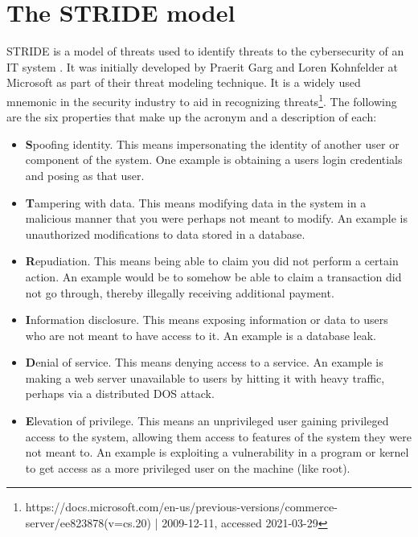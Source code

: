 \section{The STRIDE model} \label{ch:method:stride}
STRIDE is a model of threats used to identify threats to the cybersecurity of an IT system \cite{stride}. It was initially developed by Praerit Garg and Loren Kohnfelder at Microsoft as part of their threat modeling technique. It is a widely used mnemonic in the security industry to aid in recognizing threats\footnote{https://docs.microsoft.com/en-us/previous-versions/commerce-server/ee823878(v=cs.20) | 2009-12-11, accessed 2021-03-29}. The following are the six properties that make up the acronym and a description of each:
\begin{itemize}
    \item \textbf{S}poofing identity. This means impersonating the identity of another user or component of the system. One example is obtaining a users login credentials and posing as that user.
    \item \textbf{T}ampering with data. This means modifying data in the system in a malicious manner that you were perhaps not meant to modify. An example is unauthorized modifications to data stored in a database.
    \item \textbf{R}epudiation. This means being able to claim you did not perform a certain action. An example would be to somehow be able to claim a transaction did not go through, thereby illegally receiving additional payment.
    \item \textbf{I}nformation disclosure. This means exposing information or data to users who are not meant to have access to it. An example is a database leak.
    \item \textbf{D}enial of service. This means denying access to a service. An example is making a web server unavailable to users by hitting it with heavy traffic, perhaps via a distributed \gls{DOS} attack.
    \item \textbf{E}levation of privilege. This means an unprivileged user gaining privileged access to the system, allowing them access to features of the system they were not meant to. An example is exploiting a vulnerability in a program or kernel to get access as a more privileged user on the machine (like root).
\end{itemize}
